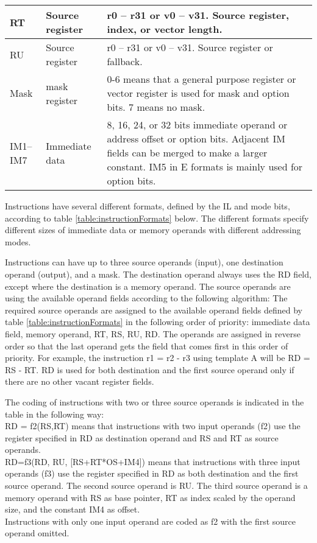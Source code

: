 \documentclass[forwardcom.tex]{subfiles}
\begin{document}
\begin{longtable} {|p{16mm}|p{16mm}|p{85mm}|}
\hline
RT & Source register & r0 – r31 or v0 – v31. Source register, index, or vector length.  \\
\hline
RU & Source register & r0 – r31 or v0 – v31. Source register or fallback. \\
\hline
Mask & mask register & 0-6 means that a general purpose register or vector register is used for mask and option bits. 7 means no mask.  \\
\hline
IM1--IM7 & Immediate data & 8, 16, 24, or 32 bits immediate operand or address offset or option bits. Adjacent IM fields can be merged to make a larger constant. IM5 in E formats is mainly used for option bits.  \\
\hline
\end{longtable}
\vv

Instructions have several different formats, defined by the IL and mode bits, according to  table \ref{table:instructionFormats} below. The different formats specify different sizes of immediate data or memory operands with different addressing modes. \\
\vv

Instructions can have up to three source operands (input), one destination operand (output), and a mask. The destination operand always uses the RD field, except where the destination is a memory operand. The source operands are using the available operand fields according to the following algorithm: The required source operands are assigned to the available
operand fields defined by table \ref{table:instructionFormats} in the following order of priority: immediate data field, memory operand, RT, RS, RU, RD. 
The operands are assigned in reverse order so that the last operand gets the field that comes first in this order of priority. For example, the instruction r1 = r2 - r3 using template A will be RD = RS - RT. RD is used for both destination and the first source operand only if there are no other vacant register fields.
\vv

The coding of instructions with two or three source operands is indicated in the table in the following way: \\
RD = f2(RS,RT)  means that instructions with two input operands (f2) use the register specified in RD as destination operand and RS and RT as source operands.\\
RD=f3(RD, RU, [RS+RT*OS+IM4])  means that instructions with three input operands (f3) use the register specified in RD as both destination and the first source operand. The second source operand is RU. The third source operand is a memory operand with RS as base pointer, RT as index scaled by the operand size, and the constant IM4 as offset.\\
Instructions with only one input operand are coded as f2 with the first source operand omitted.
\end{document}
